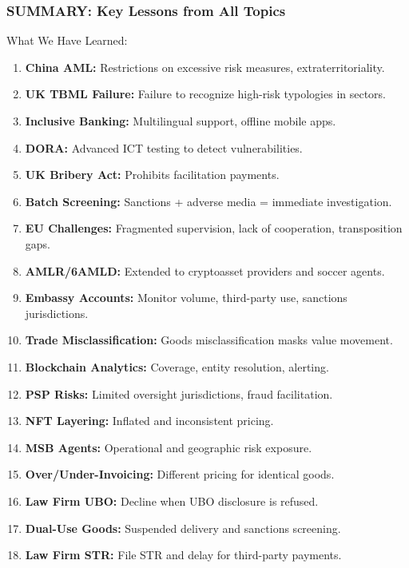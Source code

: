\documentclass[12pt,aspectratio=169]{beamer}
\renewcommand{\footnotesize}{\fontsize{7}{8}\selectfont}
\renewcommand{\small}{\fontsize{8}{9}\selectfont}
\begin{document}
\begin{frame}
\frametitle{\fontsize{14}{17}\selectfont SUMMARY: Key Lessons from All Topics}

\small
\begin{block}{\fontsize{11}{13}\selectfont What We Have Learned:}
\footnotesize
\begin{enumerate}
    \item \textbf{China AML:} Restrictions on excessive risk measures, extraterritoriality.
    \item \textbf{UK TBML Failure:} Failure to recognize high-risk typologies in sectors.
    \item \textbf{Inclusive Banking:} Multilingual support, offline mobile apps.
    \item \textbf{DORA:} Advanced ICT testing to detect vulnerabilities.
    \item \textbf{UK Bribery Act:} Prohibits facilitation payments.
    \item \textbf{Batch Screening:} Sanctions + adverse media = immediate investigation.
    \item \textbf{EU Challenges:} Fragmented supervision, lack of cooperation, transposition gaps.
    \item \textbf{AMLR/6AMLD:} Extended to cryptoasset providers and soccer agents.
    \item \textbf{Embassy Accounts:} Monitor volume, third-party use, sanctions jurisdictions.
    \item \textbf{Trade Misclassification:} Goods misclassification masks value movement.
    \item \textbf{Blockchain Analytics:} Coverage, entity resolution, alerting.
    \item \textbf{PSP Risks:} Limited oversight jurisdictions, fraud facilitation.
    \item \textbf{NFT Layering:} Inflated and inconsistent pricing.
    \item \textbf{MSB Agents:} Operational and geographic risk exposure.
    \item \textbf{Over/Under-Invoicing:} Different pricing for identical goods.
    \item \textbf{Law Firm UBO:} Decline when UBO disclosure is refused.
    \item \textbf{Dual-Use Goods:} Suspended delivery and sanctions screening.
    \item \textbf{Law Firm STR:} File STR and delay for third-party payments.

\end{enumerate}
\end{block}
\end{frame}
\end{document}
